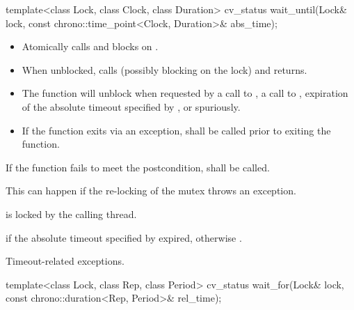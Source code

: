 %
\begin{itemdecl}
template<class Lock, class Clock, class Duration>
  cv_status wait_until(Lock& lock, const chrono::time_point<Clock, Duration>& abs_time);
\end{itemdecl}

\begin{itemdescr}
\pnum\effects

\begin{itemize}
\item
Atomically calls  and blocks on .

\item
When unblocked, calls  (possibly blocking on the lock) and returns.

\item
The function will unblock when requested by a call to , a call to ,
expiration of the absolute timeout specified by ,
or spuriously.

\item
If the function exits via an exception,  shall be called prior to exiting the function.
\end{itemize}

\pnum
\remarks
If the function fails to meet the postcondition, 
shall be called.
\begin{note} This can happen if the re-locking of the mutex throws an exception. \end{note}

\pnum
\postconditions {} is locked by the calling thread.

\pnum
\returns {} if
the absolute timeout specified by  expired,
otherwise .

\pnum
\throws Timeout-related
exceptions.

\end{itemdescr}

%
\begin{itemdecl}
template<class Lock, class Rep, class Period>
  cv_status wait_for(Lock& lock, const chrono::duration<Rep, Period>& rel_time);
\end{itemdecl}

